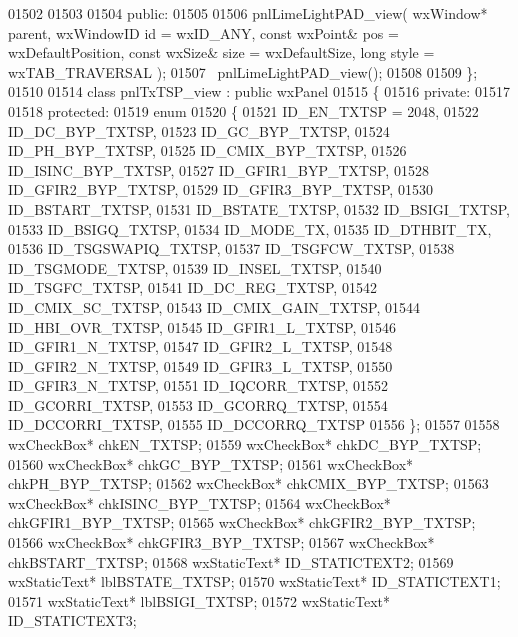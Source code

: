 \begin{DoxyCode}
01502         
01503     
01504     \textcolor{keyword}{public}:
01505         
01506         pnlLimeLightPAD_view( wxWindow* parent, wxWindowID \textcolor{keywordtype}{id} = wxID\_ANY, \textcolor{keyword}{const} wxPoint& pos = 
      wxDefaultPosition, \textcolor{keyword}{const} wxSize& size = wxDefaultSize, \textcolor{keywordtype}{long} style = wxTAB\_TRAVERSAL ); 
01507         ~pnlLimeLightPAD_view();
01508     
01509 \};
01510 
01514 \textcolor{keyword}{class }pnlTxTSP_view : \textcolor{keyword}{public} wxPanel 
01515 \{
01516     \textcolor{keyword}{private}:
01517     
01518     \textcolor{keyword}{protected}:
01519         \textcolor{keyword}{enum}
01520         \{
01521             ID\_EN\_TXTSP = 2048,
01522             ID_DC_BYP_TXTSP,
01523             ID_GC_BYP_TXTSP,
01524             ID_PH_BYP_TXTSP,
01525             ID_CMIX_BYP_TXTSP,
01526             ID_ISINC_BYP_TXTSP,
01527             ID_GFIR1_BYP_TXTSP,
01528             ID_GFIR2_BYP_TXTSP,
01529             ID_GFIR3_BYP_TXTSP,
01530             ID_BSTART_TXTSP,
01531             ID_BSTATE_TXTSP,
01532             ID_BSIGI_TXTSP,
01533             ID_BSIGQ_TXTSP,
01534             ID_MODE_TX,
01535             ID_DTHBIT_TX,
01536             ID_TSGSWAPIQ_TXTSP,
01537             ID_TSGFCW_TXTSP,
01538             ID_TSGMODE_TXTSP,
01539             ID_INSEL_TXTSP,
01540             ID_TSGFC_TXTSP,
01541             ID_DC_REG_TXTSP,
01542             ID_CMIX_SC_TXTSP,
01543             ID_CMIX_GAIN_TXTSP,
01544             ID_HBI_OVR_TXTSP,
01545             ID_GFIR1_L_TXTSP,
01546             ID_GFIR1_N_TXTSP,
01547             ID_GFIR2_L_TXTSP,
01548             ID_GFIR2_N_TXTSP,
01549             ID_GFIR3_L_TXTSP,
01550             ID_GFIR3_N_TXTSP,
01551             ID_IQCORR_TXTSP,
01552             ID_GCORRI_TXTSP,
01553             ID_GCORRQ_TXTSP,
01554             ID_DCCORRI_TXTSP,
01555             ID\_DCCORRQ\_TXTSP
01556         \};
01557         
01558         wxCheckBox* chkEN_TXTSP;
01559         wxCheckBox* chkDC_BYP_TXTSP;
01560         wxCheckBox* chkGC_BYP_TXTSP;
01561         wxCheckBox* chkPH_BYP_TXTSP;
01562         wxCheckBox* chkCMIX_BYP_TXTSP;
01563         wxCheckBox* chkISINC_BYP_TXTSP;
01564         wxCheckBox* chkGFIR1_BYP_TXTSP;
01565         wxCheckBox* chkGFIR2_BYP_TXTSP;
01566         wxCheckBox* chkGFIR3_BYP_TXTSP;
01567         wxCheckBox* chkBSTART_TXTSP;
01568         wxStaticText* ID_STATICTEXT2;
01569         wxStaticText* lblBSTATE_TXTSP;
01570         wxStaticText* ID_STATICTEXT1;
01571         wxStaticText* lblBSIGI_TXTSP;
01572         wxStaticText* ID_STATICTEXT3;

\end{DoxyCode}
